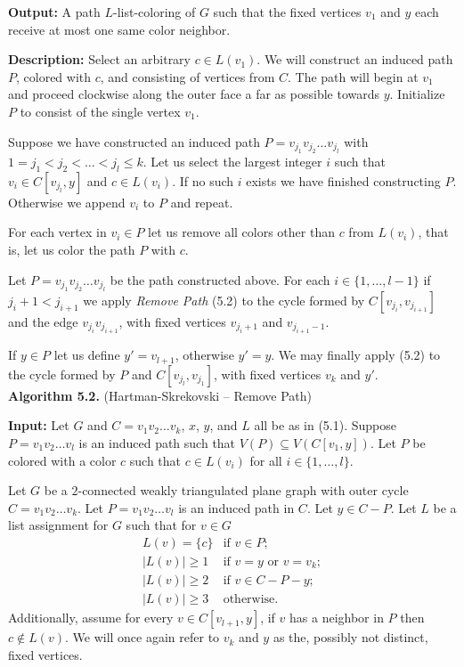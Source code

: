 \documentclass[letterpaper, 12pt]{article}
\theoremstyle{definition}
\theoremstyle{definition}
\theoremstyle{thm}
\theoremstyle{definition}
\begin{document}
\noindent\textbf{Output:} A path $L$-list-coloring of $G$ such that the fixed
vertices $v_1$ and $y$ each receive at most one same color neighbor.

\noindent\textbf{Description:} Select an arbitrary $c\in L(v_1)$. We will 
construct an induced path $P$, colored with $c$, and consisting of vertices from
$C$. The path will begin at $v_1$ and proceed clockwise along the outer face a
far as possible towards $y$. Initialize $P$ to consist of the single vertex
$v_1$.

Suppose we have constructed an induced path $P=v_{j_1}v_{j_2}\ldots v_{j_l}$
with $1=j_1<j_2<\ldots<j_l\le k$. Let us select the largest integer $i$ such that
$v_i\in C[v_{j_l},y]$ and $c\in L(v_i)$. If no such $i$ exists we have finished
constructing $P$. Otherwise we append $v_i$ to $P$ and repeat.

For each vertex in $v_i\in P$ let us remove all colors other than $c$ from $L(v_i)$,
that is, let us color the path $P$ with $c$.

Let $P=v_{j_1}v_{j_2}\ldots v_{j_l}$ be the path constructed above. For each
$i\in\{1,\ldots,l-1\}$ if $j_i+1<j_{i+1}$ we apply \textit{Remove Path} (5.2)
to the cycle formed by $C[v_{j_i},v_{j_{i+1}}]$ and the edge
$v_{j_i}v_{j_{i+1}}$, with fixed vertices $v_{j_i+1}$ and $v_{j_{i+1}-1}$.

If $y\in P$ let us define $y'=v_{l+1}$, otherwise $y'=y$.
We may finally apply  (5.2) to the cycle formed by $P$ and
$C[v_{j_l},v_{j_1}]$, with fixed vertices $v_k$ and $y'$.\\

\noindent\textbf{Algorithm 5.2.} (Hartman-Skrekovski -- Remove Path)

\noindent\textbf{Input:} Let $G$ and $C=v_1v_2\ldots v_k$, $x$, $y$, and $L$ all
be as in (5.1). Suppose $P=v_1v_2\ldots v_l$ is an induced path such that $V(P)
\subseteq V(C[v_1,y])$. Let $P$ be colored with a
color $c$ such that $c\in L(v_i)$ for all $i\in\{1,\ldots,l\}$.

Let $G$ be a $2$-connected weakly triangulated plane
graph with outer cycle $C=v_1v_2\ldots v_k$. Let $P=v_1v_2\ldots v_l$ is an
induced path in $C$. Let $y\in C-P$. Let $L$ be a list
assignment for $G$ such that for $v\in G$
\[
    \begin{array}{ll}
        L(v)=\{c\} & \text{if } v\in P;\\
	    |L(v)|\ge 1 & \text{if } v=y \text{ or } v=v_k;\\
	    |L(v)|\ge 2 & \text{if } v\in C-P-y;\\
	    |L(v)|\ge 3 & \text{otherwise.}
    \end{array}
\]
Additionally, assume for every $v\in C[v_{l+1},y]$, if $v$ has a
neighbor in $P$ then $c\not\in L(v)$.
We will once again refer to $v_k$ and $y$ as the, possibly not distinct, fixed
vertices.
\end{document}

